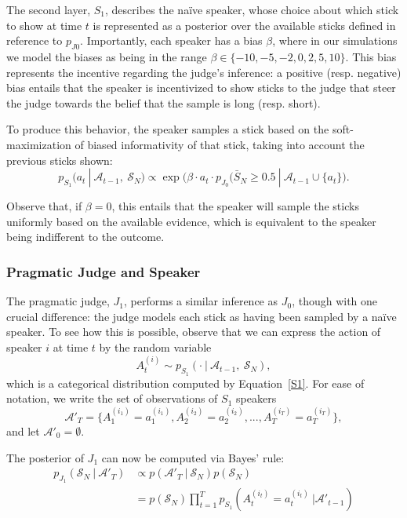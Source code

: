 \documentclass[10pt,letterpaper]{article}
\begin{document}
The second layer, $S_1$, describes the na\"ive speaker, whose choice about which stick to show
at time $t$ is represented as a posterior over the available sticks defined in reference to $p_{J0}$.
Importantly, each speaker has a bias $\beta$, where in our simulations we model the biases as being
in the range $\beta \in \{-10, -5, -2, 0, 2, 5, 10\}.$ This bias represents the incentive regarding the judge's
inference: a positive (resp. negative) bias entails that the speaker is incentivized to show sticks to the judge
that steer the judge towards the belief that the sample is long (resp. short).

To produce this behavior, the speaker samples a stick based on the soft-maximization of biased informativity
of that stick, taking into account the previous sticks shown:
\begin{equation}\label{S1}
p_{S_1} (a_t \ | \ \mathcal{A}_{t-1},\ \mathcal{S}_N) \propto \exp \bigl(\beta \cdot a_t \cdot p_{J_0} (\bar{S}_N \ge 0.5 \ | \ \mathcal{A}_{t-1} \cup \{a_t\} \bigr).
\end{equation}

Observe that, if $\beta = 0$, this entails that the speaker will sample the sticks uniformly based on the available
evidence, which is equivalent to the speaker being indifferent to the outcome.

\subsubsection{Pragmatic Judge and Speaker}
The pragmatic judge, $J_1$, performs a similar inference as $J_0$, though with one crucial difference: the judge
models each stick as having been sampled by a na\"ive speaker. To see how this is possible, observe that we can express
the action of speaker $i$ at time $t$ by the random variable 
\begin{equation}
	A_t^{(i)} \sim p_{S_1} (\cdot \ | \ \mathcal{A}_{t-1},\ \mathcal{S}_N),
\end{equation}
which is a categorical distribution computed by Equation~\ref{S1}. For ease of notation, we write the set
of observations of $S_1$ speakers
\begin{equation}
	\mathcal{A}'_T = \{ A_1^{(i_1)}=a_1^{(i_1)}, A_2^{(i_2)}=a_2^{(i_2)}, ..., A_T^{(i_T)}=a_T^{(i_T)}\}, 
\end{equation}
and let $\mathcal{A}'_0 = \emptyset$.

The posterior of $J_1$ can now be computed via Bayes' rule:
\begin{align*}
	p_{J_1} (\mathcal{S}_N \ | \ \mathcal{A}'_T) &\propto p(\mathcal{A}'_T \ | \ \mathcal{S}_N) p(\mathcal{S}_N) \\
	&=  p(\mathcal{S}_N) \prod_{t=1}^T p_{S_1}(A_t^{(i_t)}=a_t^{(i_t)} \ |  \mathcal{A}'_{t-1})
\end{align*}
\end{document}
